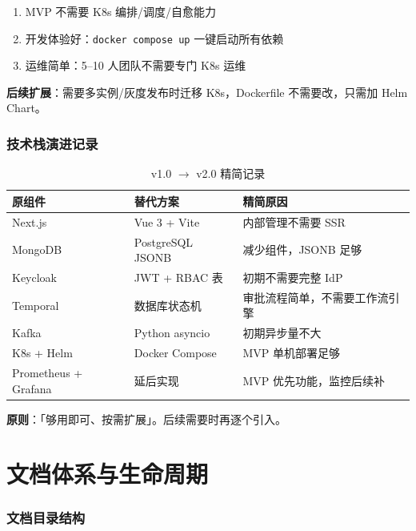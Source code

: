 \documentclass[11pt,a4paper]{article}
\begin{document}
\begin{enumerate}[nosep]
  \item MVP 不需要 K8s 编排/调度/自愈能力
  \item 开发体验好：\texttt{docker compose up} 一键启动所有依赖
  \item 运维简单：5--10 人团队不需要专门 K8s 运维
\end{enumerate}

\textbf{后续扩展}：需要多实例/灰度发布时迁移 K8s，Dockerfile 不需要改，只需加 Helm Chart。

\section{技术栈演进记录}

\begin{table}[h]
\centering
\begin{tabular}{llp{5cm}}
\toprule
\textbf{原组件} & \textbf{替代方案} & \textbf{精简原因} \\
\midrule
Next.js & Vue 3 + Vite & 内部管理不需要 SSR \\
MongoDB & PostgreSQL JSONB & 减少组件，JSONB 足够 \\
Keycloak & JWT + RBAC 表 & 初期不需要完整 IdP \\
Temporal & 数据库状态机 & 审批流程简单，不需要工作流引擎 \\
Kafka & Python asyncio & 初期异步量不大 \\
K8s + Helm & Docker Compose & MVP 单机部署足够 \\
Prometheus + Grafana & 延后实现 & MVP 优先功能，监控后续补 \\
\bottomrule
\end{tabular}
\caption{v1.0 $\to$ v2.0 精简记录}
\end{table}

\textbf{原则}：「够用即可、按需扩展」。后续需要时再逐个引入。

\part{文档体系与生命周期}

\section{文档目录结构}
\end{document}
